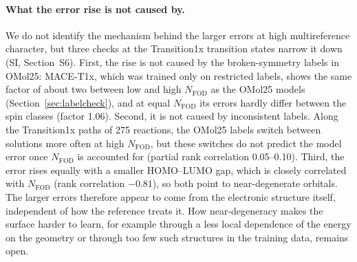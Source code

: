 \paragraph{What the error rise is not caused by.}
We do not identify the mechanism behind the larger errors at high multireference character, but three checks at the Transition1x transition states narrow it down (SI, Section~S6). First, the rise is not caused by the broken-symmetry labels in OMol25: MACE-T1x, which was trained only on restricted labels, shows the same factor of about two between low and high $N_\mathrm{FOD}$ as the OMol25 models (Section~\ref{sec:labelcheck}), and at equal $N_\mathrm{FOD}$ its errors hardly differ between the spin classes (factor 1.06). Second, it is not caused by inconsistent labels. Along the Transition1x paths of 275 reactions, the OMol25 labels switch between solutions more often at high $N_\mathrm{FOD}$, but these switches do not predict the model error once $N_\mathrm{FOD}$ is accounted for (partial rank correlation 0.05--0.10). Third, the error rises equally with a smaller HOMO--LUMO gap, which is closely correlated with $N_\mathrm{FOD}$ (rank correlation $-0.81$), so both point to near-degenerate orbitals. The larger errors therefore appear to come from the electronic structure itself, independent of how the reference treats it. How near-degeneracy makes the surface harder to learn, for example through a less local dependence of the energy on the geometry or through too few such structures in the training data, remains open.
